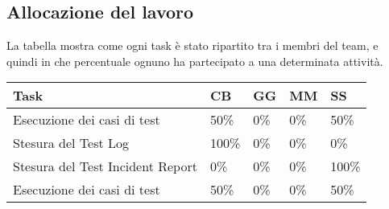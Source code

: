 \subsection{Allocazione del lavoro}
La tabella mostra come ogni task è stato ripartito tra i membri del team, e quindi in che percentuale ognuno ha partecipato a una determinata attività.
\begin{table}[ht]
 \centering
 \begin{tabular}{|p{7.5cm}|p{1cm}|p{1cm}|p{1cm}|p{1cm}|}
  \hline
  \rowcolor{Gray}\textbf{Task}			& \textbf{CB}		& \textbf{GG}		& \textbf{MM}		& \textbf{SS}		\\
  \hline
  Esecuzione dei casi di test			& 50\%			& 0\%			& 0\%			& 50\%			\\
  \hline
  Stesura del Test Log				& 100\%			& 0\%			& 0\%			& 0\%			\\
  \hline
  Stesura del Test Incident Report		& 0\%			& 0\%			& 0\%			& 100\%			\\
  \hline
  Esecuzione dei casi di test			& 50\%			& 0\%			& 0\%			& 50\%			\\
  \hline
 \end{tabular}
\end{table}
